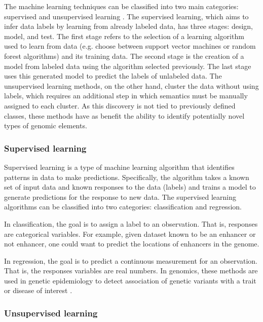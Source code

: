 The machine learning techniques can be classified into two main categories: supervised and unsupervised learning \cite{mitchell1997machine}. The supervised learning, which aims to infer data labels by learning from already labeled data, has three stages: design, model, and test. The first stage refers to the selection of a learning algorithm used to learn from data (e.g. choose between support vector machines or random forest algorithms) and its training data. The second stage is the creation of a model from labeled data using the algorithm selected previously.  The last stage uses this generated model to  predict the labels of unlabeled data.
The unsupervised learning methods, on the other hand,
cluster the data without using labels, which requires an additional step in which semantics must be manually assigned to each cluster. As this discovery is not tied to previously defined classes, these methods have as benefit the ability to identify potentially novel types of genomic elements.


\subsubsection{Supervised learning}

Supervised learning is a type of machine learning algorithm that identifies patterns in data to make predictions.
Specifically, the algorithm takes a known set of input data and known responses to the data (labels) and trains a model to generate predictions for the response to new data.
The supervised learning algorithms can be classified into two categories: classification and regression.

In classification, the goal is to assign a label to an observation. That is, responses are categorical variables.
For example, given dataset known to be
an enhancer or not enhancer, one could want to predict the locations of enhancers in the genome.

In regression, the goal is to predict a continuous measurement for an observation. That is, the responses variables are real numbers. In genomics, these methods are  used in genetic epidemiology to detect association of genetic variants with a trait or disease of interest \cite{dasgupta2011brief}.




\subsubsection{Unsupervised learning}


